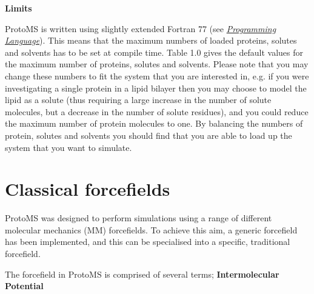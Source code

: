\documentclass[letterpaper,10pt,english]{manual}
\begin{document}
\textbf{Limits}

ProtoMS is written using slightly extended Fortran 77 (see \hyperlink{fortran77}{\emph{Programming Language}}). This means that the maximum numbers of loaded proteins, solutes and solvents has to be set at compile time. Table 1.0 gives the default values for the maximum number of proteins, solutes and solvents. Please note that you may change these numbers to fit the system that you are interested in, e.g. if you were investigating a single protein in a lipid bilayer then you may choose to model the lipid as a solute (thus requiring a large increase in the number of solute molecules, but a decrease in the number of solute residues), and you could reduce the maximum number of protein molecules to one. By balancing the numbers of protein, solutes and solvents you should find that you are able to load up the system that you want to simulate.

\section{Classical forcefields}

ProtoMS was designed to perform simulations using a range of different molecular mechanics (MM) forcefields. To achieve this aim, a generic forcefield has been implemented, and this can be specialised into a specific, traditional forcefield.

The forcefield in ProtoMS is comprised of several terms;
\textbf{Intermolecular Potential}
\end{document}
